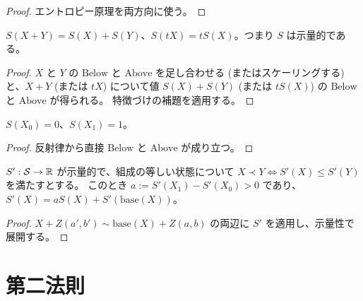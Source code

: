 \begin{proof}
  \leanok
  エントロピー原理を両方向に使う。
\end{proof}

\begin{theorem}[加法性と示量性]
  \label{thm:additive}
  \leanok
  $S(X + Y) = S(X) + S(Y)$、$S(tX) = t S(X)$。つまり $S$ は示量的である。
\end{theorem}

\begin{proof}
  \leanok
  $X$ と $Y$ の $\mathrm{Below}$ と $\mathrm{Above}$ を足し合わせる (またはスケーリングする) と、$X + Y$ (または $tX$) について値 $S(X) + S(Y)$ (または $tS(X)$) の $\mathrm{Below}$ と $\mathrm{Above}$ が得られる。
  特徴づけの補題を適用する。
\end{proof}

\begin{theorem}[較正]
  \label{thm:calibration}
  \leanok
  $S(X_0) = 0$、$S(X_1) = 1$。
\end{theorem}

\begin{proof}
  \leanok
  反射律から直接 $\mathrm{Below}$ と $\mathrm{Above}$ が成り立つ。
\end{proof}

\begin{theorem}[一意性]
  \label{thm:unique}
  \leanok
  $S' : \mathcal{S} \to \mathbb{R}$ が示量的で、組成の等しい状態について $X \prec Y \iff S'(X) \le S'(Y)$ を満たすとする。
  このとき $a := S'(X_1) - S'(X_0) > 0$ であり、$S'(X) = a S(X) + S'(\mathrm{base}(X))$。
\end{theorem}

\begin{proof}
  \leanok
  $X + Z(a', b') \sim \mathrm{base}(X) + Z(a, b)$ の両辺に $S'$ を適用し、示量性で展開する。
\end{proof}

\section{第二法則}
\label{sec:second-law}

